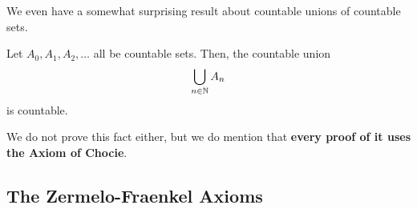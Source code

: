 We even have a somewhat surprising result about countable unions of countable sets.

\begin{boxproposition}
    Let $A_0, A_1, A_2, \ldots$ all be countable sets. Then, the countable union
    \begin{align*}
        \bigcup_{n \in \mathbb{N}} A_n
    \end{align*}
    is countable.
\end{boxproposition}

We do not prove this fact either, but we do mention that \textbf{every proof of it uses the Axiom of Chocie}.

\begin{boxexample}
    
\end{boxexample}




\subsection{The Zermelo-Fraenkel Axioms}

